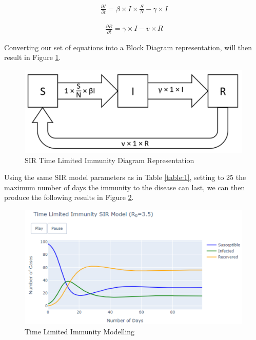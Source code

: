 \useshortskip
\begin{align}
\ \frac{\partial I}{\partial t} = \beta \times I \times \frac{S}{N} -\gamma \times I
\end{align}
\useshortskip

\useshortskip
\begin{align}
\ \frac{\partial R}{\partial t} = \gamma \times I - v \times R
\end{align}
\useshortskip

Converting our set of equations into a Block Diagram representation, will then result in Figure \ref{dimm}.

\begin{figure}[ht!]%
    \centering
    \includegraphics[width=0.75\linewidth]{latex/images/dimm.pdf}
    \caption{SIR Time Limited Immunity Diagram Representation}
    \label{dimm}
\end{figure}

Using the same SIR model parameters as in Table \ref{table:1}, setting to 25 the maximum number of days the immunity to the disease can last, we can then produce the following results in Figure \ref{low_imm}.

\begin{figure}[ht!]%
    \centering
    \includegraphics[width=0.85\linewidth]{latex/images/time_lim.pdf}
    \caption{Time Limited Immunity Modelling}
    \label{low_imm}
\end{figure}

